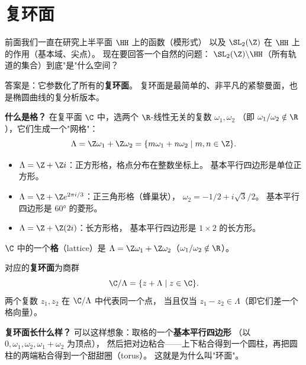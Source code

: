 \section{复环面}
\label{sec:complex-tori}

前面我们一直在研究上半平面 $\HH$ 上的函数（模形式）
以及 $\SL_2(\Z)$ 在 $\HH$ 上的作用（基本域、尖点）。
现在要回答一个自然的问题：
$\SL_2(\Z) \backslash \HH$（所有轨道的集合）到底"是"什么空间？

答案是：它参数化了所有的\textbf{复环面}。
复环面是最简单的、非平凡的紧黎曼面，也是椭圆曲线的复分析版本。

\textbf{什么是格？}
在复平面 $\C$ 中，选两个 $\R$-线性无关的复数 $\omega_1, \omega_2$
（即 $\omega_1/\omega_2 \notin \R$），它们生成一个"网格"：
\[
  \Lambda = \Z\omega_1 + \Z\omega_2
  = \{m\omega_1 + n\omega_2 \mid m, n \in \Z\}.
\]

\begin{example}[几个具体的格]
\label{ex:lattices}
\leavevmode
\begin{itemize}
  \item $\Lambda = \Z + \Z i$：正方形格，格点分布在整数坐标上。
    基本平行四边形是单位正方形。
  \item $\Lambda = \Z + \Z e^{2\pi i/3}$：正三角形格（蜂巢状），
    $\omega_2 = -1/2 + i\sqrt{3}/2$。
    基本平行四边形是 $60°$ 的菱形。
  \item $\Lambda = \Z + \Z(2i)$：长方形格，
    基本平行四边形是 $1 \times 2$ 的长方形。
\end{itemize}
\end{example}

\begin{definition}[格与复环面]
\label{def:lattice-torus}
$\C$ 中的一个\textbf{格}（lattice）是
$\Lambda = \Z\omega_1 + \Z\omega_2$（$\omega_1/\omega_2 \notin \R$）。

对应的\textbf{复环面}为商群
\[
  \C/\Lambda = \{z + \Lambda \mid z \in \C\}.
\]
两个复数 $z_1, z_2$ 在 $\C/\Lambda$ 中代表同一个点，
当且仅当 $z_1 - z_2 \in \Lambda$（即它们差一个格向量）。
\end{definition}

\textbf{复环面长什么样？}
可以这样想象：取格的一个\textbf{基本平行四边形}
（以 $0, \omega_1, \omega_2, \omega_1+\omega_2$ 为顶点），
然后把对边粘合——上下粘合得到一个圆柱，再把圆柱的两端粘合得到一个甜甜圈（torus）。
这就是为什么叫"环面"。

